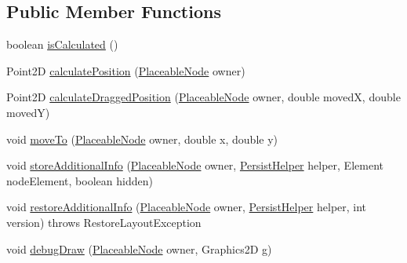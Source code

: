 \subsection*{Public Member Functions}
\begin{DoxyCompactItemize}
\item 
boolean \hyperlink{interfaceorg_1_1tzi_1_1use_1_1gui_1_1views_1_1diagrams_1_1elements_1_1positioning_1_1_position_strategy_a088ec7286518a77dbc32030b12d93070}{is\-Calculated} ()
\item 
Point2\-D \hyperlink{interfaceorg_1_1tzi_1_1use_1_1gui_1_1views_1_1diagrams_1_1elements_1_1positioning_1_1_position_strategy_a5e4633aa7ba3767e13a668c06472a4be}{calculate\-Position} (\hyperlink{classorg_1_1tzi_1_1use_1_1gui_1_1views_1_1diagrams_1_1elements_1_1_placeable_node}{Placeable\-Node} owner)
\item 
Point2\-D \hyperlink{interfaceorg_1_1tzi_1_1use_1_1gui_1_1views_1_1diagrams_1_1elements_1_1positioning_1_1_position_strategy_ade43fff779d3382e9acf27d88138645b}{calculate\-Dragged\-Position} (\hyperlink{classorg_1_1tzi_1_1use_1_1gui_1_1views_1_1diagrams_1_1elements_1_1_placeable_node}{Placeable\-Node} owner, double moved\-X, double moved\-Y)
\item 
void \hyperlink{interfaceorg_1_1tzi_1_1use_1_1gui_1_1views_1_1diagrams_1_1elements_1_1positioning_1_1_position_strategy_af4b124b22fd21fb61eb3d8fe0f5d14f8}{move\-To} (\hyperlink{classorg_1_1tzi_1_1use_1_1gui_1_1views_1_1diagrams_1_1elements_1_1_placeable_node}{Placeable\-Node} owner, double x, double y)
\item 
void \hyperlink{interfaceorg_1_1tzi_1_1use_1_1gui_1_1views_1_1diagrams_1_1elements_1_1positioning_1_1_position_strategy_aeefc92690d78ec3452c109f53cb36d8a}{store\-Additional\-Info} (\hyperlink{classorg_1_1tzi_1_1use_1_1gui_1_1views_1_1diagrams_1_1elements_1_1_placeable_node}{Placeable\-Node} owner, \hyperlink{classorg_1_1tzi_1_1use_1_1gui_1_1util_1_1_persist_helper}{Persist\-Helper} helper, Element node\-Element, boolean hidden)
\item 
void \hyperlink{interfaceorg_1_1tzi_1_1use_1_1gui_1_1views_1_1diagrams_1_1elements_1_1positioning_1_1_position_strategy_ae920d61f6bd6382e5d39d23564a9df3c}{restore\-Additional\-Info} (\hyperlink{classorg_1_1tzi_1_1use_1_1gui_1_1views_1_1diagrams_1_1elements_1_1_placeable_node}{Placeable\-Node} owner, \hyperlink{classorg_1_1tzi_1_1use_1_1gui_1_1util_1_1_persist_helper}{Persist\-Helper} helper, int version)  throws Restore\-Layout\-Exception
\item 
void \hyperlink{interfaceorg_1_1tzi_1_1use_1_1gui_1_1views_1_1diagrams_1_1elements_1_1positioning_1_1_position_strategy_a00910dffbc249c425f8e05228dcb1ae1}{debug\-Draw} (\hyperlink{classorg_1_1tzi_1_1use_1_1gui_1_1views_1_1diagrams_1_1elements_1_1_placeable_node}{Placeable\-Node} owner, Graphics2\-D g)

\end{DoxyCompactItemize}
